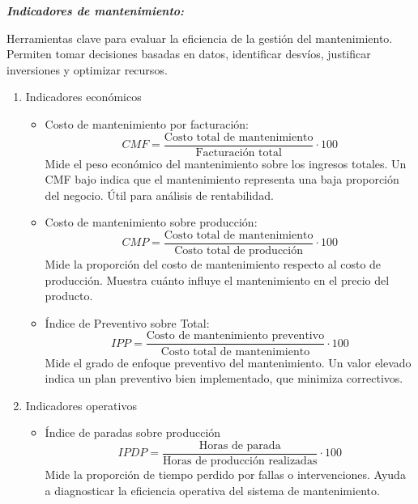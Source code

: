 \documentclass[a4paper,oneside,11pt]{article}
\begin{document}
\textbf{\textit{Indicadores de mantenimiento:}}

Herramientas clave para evaluar la eficiencia de la gestión del mantenimiento.
Permiten tomar decisiones basadas en datos, identificar desvíos, justificar inversiones y optimizar recursos.

\begin{enumerate}
    \item Indicadores económicos
    \begin{itemize}
        \item Costo de mantenimiento por facturación:
        \begin{equation*}
            CMF = \dfrac{\text{Costo total de mantenimiento}}{\text{Facturación total}} \cdot 100
        \end{equation*}
        Mide el peso económico del mantenimiento sobre los ingresos totales. Un CMF bajo indica que el mantenimiento representa una baja proporción del negocio. Útil para análisis de rentabilidad.

        \item Costo de mantenimiento sobre producción:
        \begin{equation*}
            CMP = \dfrac{\text{Costo total de mantenimiento}}{\text{Costo total de producción}} \cdot 100
        \end{equation*}
        Mide la proporción del costo de mantenimiento respecto al costo de producción. Muestra cuánto influye el mantenimiento en el precio del producto.

        \item Índice de Preventivo sobre Total:
        \begin{equation*}
            IPP = \dfrac{\text{Costo de mantenimiento preventivo}}{\text{Costo total de mantenimiento}} \cdot 100
        \end{equation*}
        Mide el grado de enfoque preventivo del mantenimiento. Un valor elevado indica un plan preventivo bien implementado, que minimiza correctivos.
    \end{itemize}

    \item Indicadores operativos
    \begin{itemize}
        \item Índice de paradas sobre producción
        \begin{equation*}
            IPDP=\dfrac{\text{Horas de parada}}{\text{Horas de producción realizadas}} \cdot 100
        \end{equation*}
        Mide la proporción de tiempo perdido por fallas o intervenciones. Ayuda a diagnosticar la eficiencia operativa del sistema de mantenimiento.
        

\end{itemize}
\end{enumerate}
\end{document}
